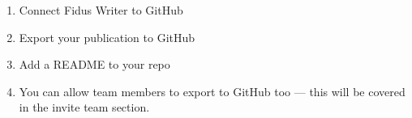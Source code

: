 \documentclass{article}
\newlength{\imgwidth}
\newcommand\scaledgraphics[2]{%
                
\settowidth{\imgwidth}{\texttt{[image: \#1]}}%
                
\setlength{\imgwidth}{\minof{\imgwidth}{#2\textwidth}}%
                
\texttt{[image: \#1]}%
                
}
\begin{document}
\begin{enumerate}
\begin{figure}
\scaledgraphics{a0b7b868-c526-485f-8f20-c2460cb693ac.png}{1}
\label{F85415421}
\end{figure}


\textbf{Step 2:}


To enable the Paginated Web version of your publication the repo address needs to be added to the setup.json file in the top level of your repo.

\begin{figure}
\scaledgraphics{fde2c425-6646-447e-94ee-d0d93459de8a.png}{1}
\label{F23728731}
\end{figure}


Edit the file setup.json and add in the organisation name and repo name into line 3 and save at the bottom of the page. "repoURL": "https://github.com/organisation-name/publication-name/".

\begin{figure}
\scaledgraphics{a4d479fd-2aea-4114-8740-571c5d952b93.png}{1}
\label{F41371831}
\end{figure}

\begin{figure}
\scaledgraphics{693958a1-b909-4dfd-ac6a-0ede6a0c344b.png}{1}
\label{F50720561}
\end{figure}


\item Connect Fidus Writer to GitHub





\item Export your publication to GitHub


\item Add a README to your repo


\item You can allow team members to export to GitHub too — this will be covered in the invite team section.


\end{enumerate}




\printbibliography[title={Bibliography}]
\end{document}
